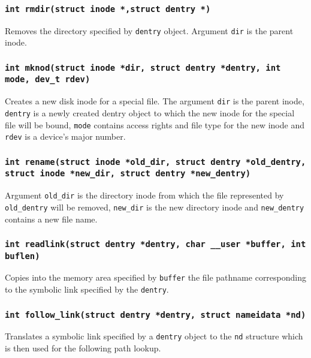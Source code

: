 \subsubsection{\texttt{int rmdir(struct inode *,struct dentry *)}}

Removes the directory specified by \texttt{dentry} object. Argument \texttt{dir} is 
the parent inode.

\subsubsection{\texttt{int mknod(struct inode *dir, struct dentry *dentry, int mode,
dev\_t rdev)}}

Creates a new disk inode for a special file. The argument \texttt{dir} is the parent inode,
\texttt{dentry} is a newly created dentry object to which the new inode for the
special file will be bound, \texttt{mode} contains access rights and file type for the new
inode and \texttt{rdev} is a device's major number.

\subsubsection{\texttt{int rename(struct inode *old\_dir, struct dentry
*old\_dentry,\\ struct inode *new\_dir, struct dentry *new\_dentry)}}

Argument \texttt{old\_dir} is the directory inode from which the file represented
by \texttt{old\_dentry} will be removed, \texttt{new\_dir} is the new directory inode and
\texttt{new\_dentry} contains a new file name.

\subsubsection{\texttt{int readlink(struct dentry *dentry, char \_\_user *buffer,
int buflen)}}

Copies into the memory area specified by \texttt{buffer} the file pathname corresponding
to the symbolic link specified by the \texttt{dentry}.

\subsubsection{\texttt{int follow\_link(struct dentry *dentry, struct nameidata *nd)}}

Translates a symbolic link specified by a \texttt{dentry} object to the \texttt{nd}
structure which is then used for the following path lookup. 

